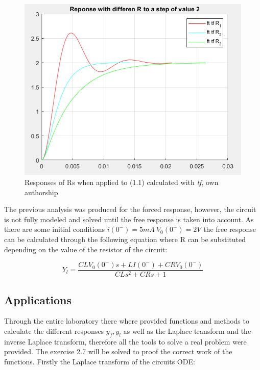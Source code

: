 \documentclass[a4paper,12pt]{article}
\begin{document}
\begin{figure}[H]
    \centering
    \includegraphics[width=0.5\linewidth]{response diff r.png}
    \caption{Responses of Rs when applied to (1.1) calculated with \textit{tf}, own authorship}
    \label{fig:response-diff-r}
\end{figure}

\vspace{0.5cm}

The previous analysis was produced for the forced response, however, the circuit is not fully modeled and solved until the free response is taken into account. As there are some initial conditions \(i(0^-) = 5mA \ V_0(0^-) = 2V\) the free response can be calculated through the following equation where R can be substituted depending on the value of the resistor of the circuit:

\vspace{0.5cm}

\begin{equation}
    Y_l = \frac{CLV_0(0^-)s + LI(0^-) + CRV_0(0^-)}{CLs^2 + CRs + 1}
\end{equation}

\vspace{0.5cm}

\subsection{Applications}

\vspace{0.5cm}

Through the entire laboratory there where provided functions and methods to calculate the different responses \(y_f, y_l\) as well as the Laplace transform and the inverse Laplace transform, therefore all the tools to solve a real problem were provided. The exercise 2.7 will be solved to proof the correct work of the functions. Firstly the Laplace transform of the circuits ODE:

\vspace{0.5cm}
\end{document}
